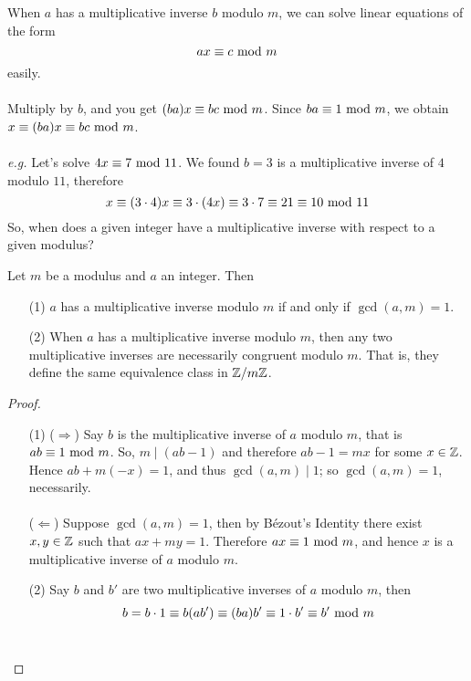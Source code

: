 \vspace*{1em}

When $a$ has a multiplicative inverse $b$ modulo $m$, we can solve linear equations of the form
\[ax \equiv c \text{ mod }{m}\]
easily.\\
\\
Multiply by $b$, and you get $(ba)x \equiv bc\text{ mod }{m}$. Since $ba \equiv 1 \text{ mod }{m}$, we obtain $x \equiv (ba)x \equiv bc \text{ mod }{m}$.\\
\\
\emph{e.g.} Let's solve $4x \equiv 7\text{ mod }{11}$. We found $b = 3$ is a multiplicative inverse of $4$ modulo $11$, therefore
\[x \equiv (3\cdot 4)x \equiv 3\cdot (4x) \equiv 3\cdot 7\equiv 21 \equiv 10\text{ mod }{11}\]
So, when does a given integer have a multiplicative inverse with respect to a given modulus?

\vspace*{1.5em}

\begin{theorem}\label{modinv}
Let $m$ be a modulus and $a$ an integer. Then
\begin{itemize}
\item[(1)] $a$ has a multiplicative inverse modulo $m$ if and only if $\gcd(a,m) = 1$.
\item[(2)] When $a$ has a multiplicative inverse modulo $m$, then any two multiplicative inverses are necessarily congruent modulo $m$. That is, they define the same equivalence class in $\mathbb Z/m\mathbb Z$.
\end{itemize}
\end{theorem}
\begin{proof}\hfill
\begin{itemize}
\item[(1)] ($\Rightarrow$) Say $b$ is the multiplicative inverse of $a$ modulo $m$, that is $ab \equiv 1 \text{ mod }{m}$. So, $m\mid (ab - 1)$ and therefore $ab - 1 = mx$ for some $x\in \mathbb Z$. Hence $ab + m(-x) = 1$, and thus $\gcd(a,m)\mid 1$; so $\gcd(a,m) = 1$, necessarily.\\
\\
($\Leftarrow$) Suppose $\gcd(a,m) = 1$, then by B\'ezout's Identity there exist $x,y \in \mathbb Z$ such that $ax + my = 1$. Therefore $ax \equiv 1 \text{ mod }{m}$, and hence $x$ is a multiplicative inverse of $a$ modulo $m$.
\item[(2)] Say $b$ and $b'$ are two multiplicative inverses of $a$ modulo $m$, then
\[b = b\cdot 1\equiv b(ab')\equiv (ba)b' \equiv 1\cdot b' \equiv b'\text{ mod }{m}\]\\[-5em]
\end{itemize}
\end{proof}

